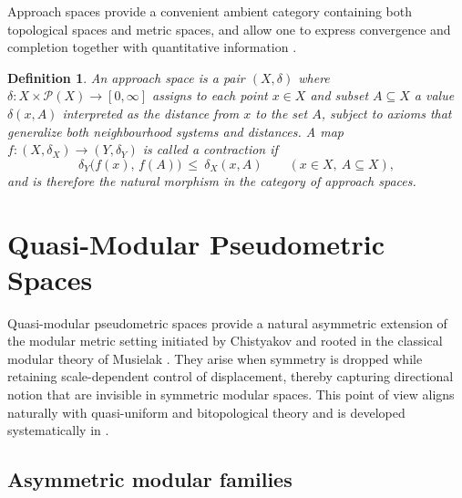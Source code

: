 \documentclass[preprint,12pt]{elsarticle}
\newtheorem{definition}[theorem]{Definition}
\begin{document}
Approach spaces provide a convenient ambient category containing both
topological spaces and metric spaces, and allow one to express
convergence and completion together with quantitative information
\cite{Lowen1989,Lowen1997}.

\begin{definition}
\label{def:approach:basic}
An \emph{approach space} is a pair $(X,\delta)$ where
$\delta:X\times\mathcal{P}(X)\to[0,\infty]$ assigns to each point $x\in X$
and subset $A\subseteq X$ a value $\delta(x,A)$ interpreted as the
distance from $x$ to the set $A$, subject to axioms that generalize both
neighbourhood systems and distances. A map
$f:(X,\delta_X)\to(Y,\delta_Y)$ is called a \emph{contraction} if
\[
\delta_Y\bigl(f(x),\,f(A)\bigr)\ \le\ \delta_X(x,A)
\qquad(x\in X,\ A\subseteq X),
\]
and is therefore the natural morphism in the category of approach spaces.
\end{definition}





\section{Quasi-Modular Pseudometric Spaces}\label{sec:quasi-modular}

Quasi-modular pseudometric spaces provide a natural asymmetric extension
of the modular metric setting initiated by Chistyakov
\cite{Chistyakov2010,Chistyakov2015} and rooted in the classical modular
theory of Musielak \cite{Musielak1983}.
They arise when symmetry is dropped while retaining scale-dependent
control of displacement, thereby capturing directional notion that
are invisible in symmetric modular spaces.
This point of view aligns naturally with quasi-uniform and bitopological
theory \cite{FletcherLindgren,Kunzi2001} and is developed systematically
in \cite{Majozi2025}.

\subsection{Asymmetric modular families}\label{ssec:asym-modulars}
\end{document}
